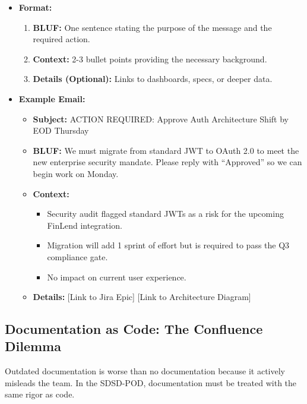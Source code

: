 \begin{itemize}
\tightlist
\item
  \textbf{Format:}

  \begin{enumerate}
  \def\labelenumi{\arabic{enumi}.}
  \tightlist
  \item
    \textbf{BLUF:} One sentence stating the purpose of the message and
    the required action.
  \item
    \textbf{Context:} 2-3 bullet points providing the necessary
    background.
  \item
    \textbf{Details (Optional):} Links to dashboards, specs, or deeper
    data.
  \end{enumerate}
\item
  \textbf{Example Email:}

  \begin{itemize}
  \tightlist
  \item
    \textbf{Subject:} ACTION REQUIRED: Approve Auth Architecture Shift
    by EOD Thursday
  \item
    \textbf{BLUF:} We must migrate from standard JWT to OAuth 2.0 to
    meet the new enterprise security mandate. Please reply with
    ``Approved'' so we can begin work on Monday.
  \item
    \textbf{Context:}

    \begin{itemize}
    \tightlist
    \item
      Security audit flagged standard JWTs as a risk for the upcoming
      FinLend integration.
    \item
      Migration will add 1 sprint of effort but is required to pass the
      Q3 compliance gate.
    \item
      No impact on current user experience.
    \end{itemize}
  \item
    \textbf{Details:} {[}Link to Jira Epic{]} {[}Link to Architecture
    Diagram{]}
  \end{itemize}
\end{itemize}

\subsection{Documentation as Code: The Confluence
Dilemma}\label{documentation-as-code-the-confluence-dilemma}

Outdated documentation is worse than no documentation because it
actively misleads the team. In the SDSD-POD, documentation must be
treated with the same rigor as code.

